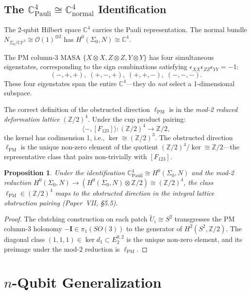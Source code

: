 \documentclass[11pt,a4paper]{article}
\newtheorem{proposition}[theorem]{Proposition}
\theoremstyle{remark}
\newcommand{\CP}{\mathbb{CP}}
\newcommand{\C}{\mathbb{C}}
\newcommand{\Z}{\mathbb{Z}}
\newcommand{\cO}{\mathcal{O}}
\begin{document}
\subsection{The $\C^4_{\text{Pauli}} \cong \C^4_{\text{normal}}$ Identification}

The 2-qubit Hilbert space $\C^4$ carries the Pauli representation.
The normal bundle $N_{\Sigma_0/\CP^3} \cong \cO(1)^{\oplus 2}$ has
$H^0(\Sigma_0, N) \cong \C^4$.

The PM column-3 MASA $\{X \otimes X, Z \otimes Z, Y \otimes Y\}$ has
four simultaneous eigenstates, corresponding to the sign combinations
satisfying $\epsilon_{XX}\epsilon_{ZZ}\epsilon_{YY} = -1$:
\[
(-,+,+),\; (+,-,+),\; (+,+,-),\; (-,-,-).
\]
These four eigenstates span the entire $\C^4$---they do \emph{not}
select a 1-dimensional subspace.

The correct definition of the obstructed direction $\ell_{\text{PM}}$ is
in the \emph{mod-2 reduced deformation lattice} $(\Z/2)^4$. Under the cup
product pairing:
\[
\langle -, [F_{123}] \rangle: (\Z/2)^4 \longrightarrow \Z/2,
\]
the kernel has codimension 1, i.e., $\ker \cong (\Z/2)^3$. The obstructed
direction $\ell_{\text{PM}}$ is the unique non-zero element of the
quotient $(\Z/2)^4 / \ker \cong \Z/2$---the representative class that
pairs non-trivially with $[F_{123}]$.

\begin{proposition}
\label{prop:ellPM}
Under the identification $\C^4_{\text{Pauli}} \cong H^0(\Sigma_0, N)$
and the mod-2 reduction
$H^0(\Sigma_0, N) \to (H^0(\Sigma_0, N) \otimes \Z/2) \cong (\Z/2)^4$,
the class $\ell_{\text{PM}} \in (\Z/2)^4$ maps to the obstructed direction
in the integral lattice obstruction pairing (Paper~VII, \S5.5).
\end{proposition}

\begin{proof}
The clutching construction on each patch $\tilde{U}_i \cong S^2$
transgresses the PM column-3 holonomy $-\mathbf{I} \in \pi_1(SO(3))$ to
the generator of $H^2(S^2, \Z/2)$. The diagonal class
$(1,1,1) \in \ker d_1 \subset E_2^{0,2}$ is the unique non-zero element,
and its preimage under the mod-2 reduction is $\ell_{\text{PM}}$.
\end{proof}

\section{$n$-Qubit Generalization}
\label{sec:nqubit}
\end{document}

